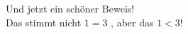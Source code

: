 \documentclass{kimbblaetter}
\begin{document}
	\showinfo

	
	
	Und jetzt ein schöner Beweis!
	\beweisbox
	\\
	Das stimmt nicht $ 1 = 3 $ \kreuzf, aber das $ 1 < 3 $\hakenw!
	
\end{document}
